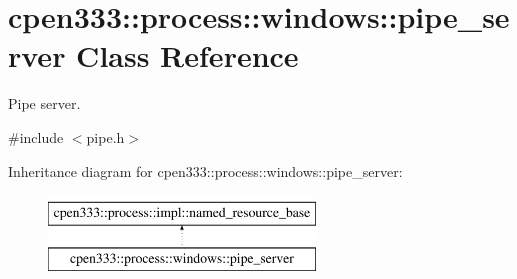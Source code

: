 \hypertarget{classcpen333_1_1process_1_1windows_1_1pipe__server}{}\section{cpen333\+:\+:process\+:\+:windows\+:\+:pipe\+\_\+server Class Reference}
\label{classcpen333_1_1process_1_1windows_1_1pipe__server}


Pipe server.  




{\ttfamily \#include $<$pipe.\+h$>$}

Inheritance diagram for cpen333\+:\+:process\+:\+:windows\+:\+:pipe\+\_\+server\+:\begin{figure}[H]
\begin{center}
\leavevmode
\includegraphics[height=2.000000cm]{classcpen333_1_1process_1_1windows_1_1pipe__server}
\end{center}
\end{figure}
